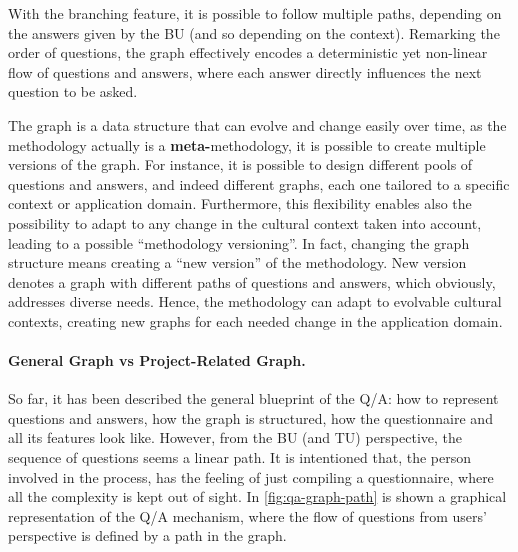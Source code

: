 \documentclass[12pt,a4paper,openright,twoside]{book}
\begin{document}
With the branching feature, it is possible to follow multiple paths, depending on the answers given by the \acf{BU} (and so depending on the context).
%
Remarking the order of questions, the graph effectively encodes a deterministic yet non-linear flow of questions and answers, where each answer directly influences the next question to be asked.

The graph is a data structure that can evolve and change easily over time, as the methodology actually is a \textbf{meta-}methodology, it is possible to create multiple versions of the graph.
%
For instance, it is possible to design different pools of questions and answers, and indeed different graphs, each one tailored to a specific context or application domain.
%
Furthermore, this flexibility enables also the possibility to adapt to any change in the cultural context taken into account, leading to a possible ``methodology versioning''.
%
In fact, changing the graph structure means creating a ``new version'' of the methodology.
%
New version denotes a graph with different paths of questions and answers, which obviously, addresses diverse needs.
%
Hence, the methodology can adapt to evolvable cultural contexts, creating new graphs for each needed change in the application domain.

\paragraph{General Graph vs Project-Related Graph.}
So far, it has been described the general blueprint of the \ac{Q/A}: how to represent questions and answers, how the graph is structured, how the questionnaire and all its features look like.
%
However, from the \acl{BU} (and \acl{TU}) perspective, the sequence of questions seems a linear path.
%
It is intentioned that, the person involved in the process, has the feeling of just compiling a questionnaire, where all the complexity is kept out of sight.
%
In \cref{fig:qa-graph-path} is shown a graphical representation of the \ac{Q/A} mechanism, where the flow of questions from users' perspective is defined by a path in the graph.
\end{document}
